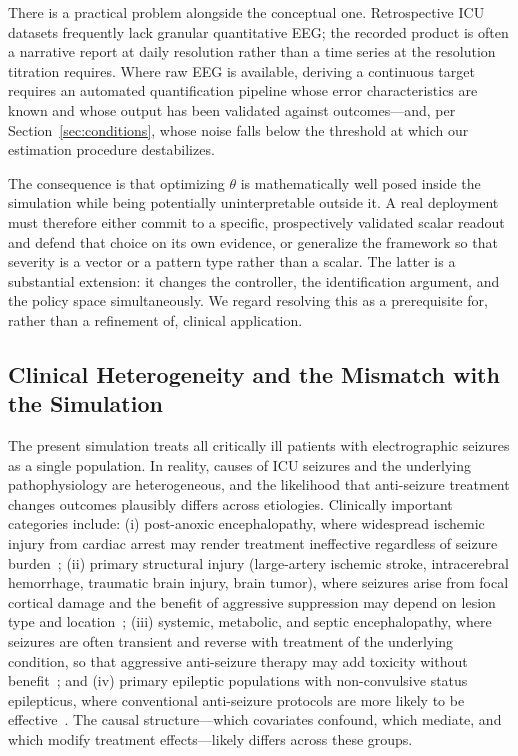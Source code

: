 There is a practical problem alongside the conceptual one. Retrospective ICU datasets frequently
lack granular quantitative EEG; the recorded product is often a narrative report at daily resolution
rather than a time series at the resolution titration requires. Where raw EEG is available, deriving
a continuous target requires an automated quantification pipeline whose error characteristics are
known and whose output has been validated against outcomes---and, per
Section~\ref{sec:conditions}, whose noise falls below the threshold at which our estimation
procedure destabilizes.

The consequence is that optimizing $\theta$ is mathematically well posed inside the simulation while
being potentially uninterpretable outside it. A real deployment must therefore either commit to a
specific, prospectively validated scalar readout and defend that choice on its own evidence, or
generalize the framework so that severity is a vector or a pattern type rather than a scalar. The
latter is a substantial extension: it changes the controller, the identification argument, and the
policy space simultaneously. We regard resolving this as a prerequisite for, rather than a
refinement of, clinical application.

\subsection{Clinical Heterogeneity and the Mismatch with the Simulation}

The present simulation treats all critically ill patients with electrographic seizures as a single
population. In reality, causes of ICU seizures and the underlying pathophysiology are heterogeneous,
and the likelihood that anti-seizure treatment changes outcomes plausibly differs across etiologies.
Clinically important categories include: (i) post-anoxic encephalopathy, where widespread ischemic
injury from cardiac arrest may render treatment ineffective regardless of seizure
burden~\cite{rossetti2005refractory,ruijter2022treating}; (ii) primary structural injury
(large-artery ischemic stroke, intracerebral hemorrhage, traumatic brain injury, brain tumor), where
seizures arise from focal cortical damage and the benefit of aggressive suppression may depend on
lesion type and location~\cite{claassen2004detection,vespa2005continuous}; (iii) systemic,
metabolic, and septic encephalopathy, where seizures are often transient and reverse with treatment
of the underlying condition, so that aggressive anti-seizure therapy may add toxicity without
benefit~\cite{sutter2016status}; and (iv) primary epileptic populations with non-convulsive status
epilepticus, where conventional anti-seizure protocols are more likely to be
effective~\cite{trinka2015definition,husain2018randomized}. The causal structure---which covariates
confound, which mediate, and which modify treatment effects---likely differs across these groups.

